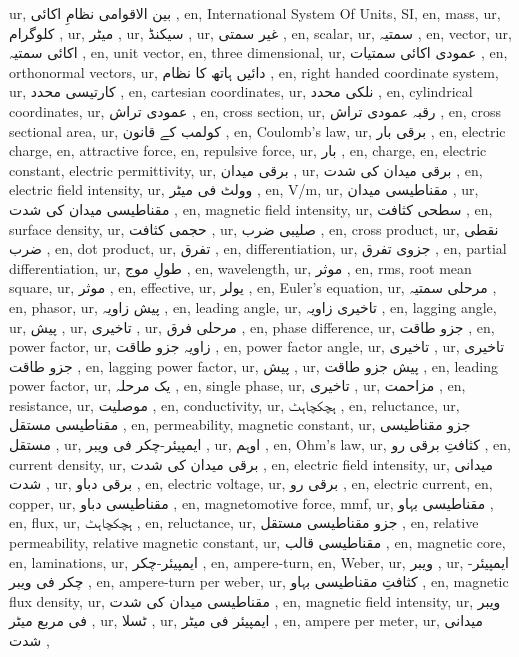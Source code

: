 ur, بین الاقوامی نظامِ اکائی ,
en, International System Of Units, SI,
en, mass,
ur, کلوگرام ,
ur, میٹر ,
ur, سیکنڈ ,
ur, غیر سمتی ,
en, scalar,
ur, سمتیہ ,
en, vector,
ur, اکائی سمتیہ ,
en, unit vector,
en, three dimensional,
ur, عمودی اکائی سمتیات ,
en, orthonormal vectors,
ur, دائیں ہاتھ کا نظام ,
en, right handed coordinate system,
ur, کارتیسی محدد ,
en, cartesian coordinates,
ur, نلکی محدد ,
en, cylindrical coordinates,
ur, عمودی تراش ,
en, cross section,
ur, رقبہ عمودی تراش ,
en, cross sectional area,
ur, کولمب کے قانون ,
en, Coulomb's law,
ur, برقی بار ,
en, electric charge,
en, attractive force,
en, repulsive force,
ur, بار ,
en, charge,
en, electric constant, electric permittivity,
ur, برقی میدان ,
ur, برقی میدان کی شدت ,
en, electric field intensity,
ur, وولٹ فی میٹر ,
en, \si {\volt / \meter },
ur, مقناطیسی میدان ,
ur, مقناطیسی میدان کی شدت ,
en, magnetic field intensity,
ur, سطحی کثافت ,
en, surface density,
ur, حجمی کثافت ,
ur, صلیبی ضرب ,
en, cross product,
ur, نقطی ضرب ,
en, dot product,
ur, تفرق ,
en, differentiation,
ur, جزوی تفرق ,
en, partial differentiation,
ur, طولِ موج ,
en, wavelength,
ur, موثر ,
en, rms, root mean square,
ur, موثر ,
en, effective,
ur, یولر ,
en, Euler's equation,
ur, مرحلی سمتیہ ,
en, phasor,
ur, پیش زاویہ ,
en, leading angle,
ur, تاخیری زاویہ ,
en, lagging angle,
ur, پیش ,
ur, تاخیری ,
ur, مرحلی فرق ,
en, phase difference,
ur, جزو طاقت ,
en, power factor,
ur, زاویہ جزو طاقت ,
en, power factor angle,
ur, تاخیری ,
ur, تاخیری جزو طاقت ,
en, lagging power factor,
ur, پیش ,
ur, پیش جزو طاقت ,
en, leading power factor,
ur, یک مرحلہ ,
en, single phase,
ur, تاخیری ,
ur, مزاحمت ,
en, resistance,
ur, موصلیت ,
en, conductivity,
ur, ہچکچاہٹ ,
en, reluctance,
ur, مقناطیسی مستقل ,
en, permeability, magnetic constant,
ur, جزو مقناطیسی مستقل ,
ur, ایمپیئر-چکر فی ویبر ,
ur, اوہم ,
en, Ohm's law,
ur, کثافتِ برقی رو ,
en, current density,
ur, برقی میدان کی شدت ,
en, electric field intensity,
ur, میدانی شدت ,
ur, برقی دباو ,
en, electric voltage,
ur, برقی رو ,
en, electric current,
en, copper,
ur, مقناطیسی دباو ,
en, magnetomotive force, mmf,
ur, مقناطیسی بہاو ,
en, flux,
ur, ہچکچاہٹ ,
en, reluctance,
ur, جزو مقناطیسی مستقل ,
en, relative permeability, relative magnetic constant,
ur, مقناطیسی قالب ,
en, magnetic core,
en, laminations,
ur, ایمپیئر-چکر ,
en, ampere-turn,
en, Weber,
ur, ویبر ,
ur, ایمپیئر-چکر فی ویبر ,
en, ampere-turn per weber,
ur, کثافتِ مقناطیسی بہاو ,
en, magnetic flux density,
ur, مقناطیسی میدان کی شدت ,
en, magnetic field intensity,
ur, ویبر فی مربع میٹر ,
ur, ٹسلا ,
ur, ایمپیئر فی میٹر ,
en, ampere per meter,
ur, میدانی شدت ,
